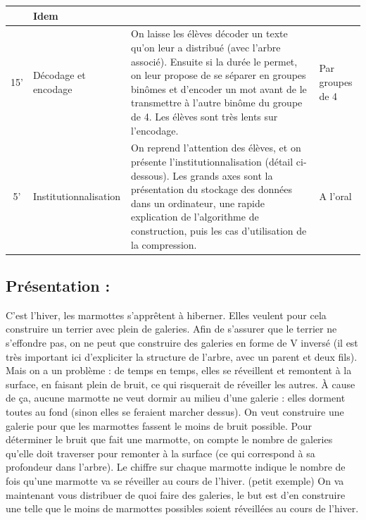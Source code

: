 \documentclass[12pt, a4paper]{article}
\begin{document}
\begin{longtable}{c|m{3.9cm}|m{8.4cm}|m{2.4cm}}
		& Idem
		
		\\ \hline
		
		15' &
		
	  Décodage et encodage
		
		&
		
		On laisse les élèves décoder un texte qu'on leur a distribué (avec l'arbre associé). Ensuite si la durée le permet,
    on leur propose de se séparer en groupes binômes et d'encoder un mot avant de le transmettre à l'autre binôme du groupe
    de 4. Les élèves sont très lents sur l'encodage.
		
		&
		
		Par groupes de 4
		
		\\ \hline
		
		5'
		
		&
		
		Institutionnalisation
		
		&
		
		On reprend l'attention des élèves, et on présente l'institutionnalisation (détail ci-dessous). Les grands axes sont la
    présentation du stockage des données dans un ordinateur, une rapide explication de l'algorithme de construction, puis
    les cas d'utilisation de la compression.
		
		&
		
		A l'oral
		
	\end{longtable}
	
	
\subsection*{Présentation :}
C’est l’hiver, les marmottes s’apprêtent à hiberner. Elles veulent pour cela construire un terrier avec plein de galeries. Afin de
s’assurer que le terrier ne s’effondre pas, on ne peut que construire des galeries en forme de V inversé (il est très important ici
d'expliciter la structure de l'arbre, avec un parent et deux fils). Mais on a un problème : de temps en temps, elles se réveillent
et remontent à la surface, en faisant plein de bruit, ce qui risquerait de réveiller les autres. À cause de ça, aucune marmotte ne
veut dormir au milieu d’une galerie : elles dorment toutes au fond (sinon elles se feraient marcher dessus). On veut construire une
galerie pour que les marmottes fassent le moins de bruit possible. Pour déterminer le bruit que fait une marmotte, on compte le nombre
de galeries qu'elle doit traverser pour remonter à la surface (ce qui correspond à sa profondeur dans l'arbre). Le chiffre sur chaque
marmotte indique le nombre de fois qu’une marmotte va se réveiller au cours de l’hiver. (petit exemple)
On va maintenant vous distribuer de quoi faire des galeries, le but est d’en construire une telle que le moins de marmottes possibles
soient réveillées au cours de l’hiver.
\end{document}
